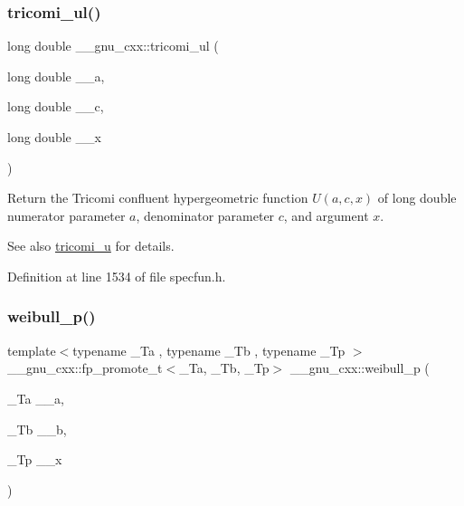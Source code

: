 \subsubsection{\texorpdfstring{tricomi\+\_\+ul()}{tricomi\_ul()}}
{\footnotesize\ttfamily long double \+\_\+\+\_\+gnu\+\_\+cxx\+::tricomi\+\_\+ul (\begin{DoxyParamCaption}\item[{long double}]{\+\_\+\+\_\+a,  }\item[{long double}]{\+\_\+\+\_\+c,  }\item[{long double}]{\+\_\+\+\_\+x }\end{DoxyParamCaption})\hspace{0.3cm}{\ttfamily [inline]}}

Return the Tricomi confluent hypergeometric function $ U(a,c,x) $ of {\ttfamily long double} numerator parameter $ a $, denominator parameter $ c $, and argument $ x $.

\begin{DoxySeeAlso}{See also}
\hyperlink{group__gnu__math__spec__func_gaf51a13fad85006e4d65c5b117e49f7d8}{tricomi\+\_\+u} for details. 
\end{DoxySeeAlso}


Definition at line 1534 of file specfun.\+h.

\mbox{\label{group__gnu__math__spec__func_ga9afb3065fea6ef3a91126d67f726f7af}} 
\subsubsection{\texorpdfstring{weibull\+\_\+p()}{weibull\_p()}}
{\footnotesize\ttfamily template$<$typename \+\_\+\+Ta , typename \+\_\+\+Tb , typename \+\_\+\+Tp $>$ \\
\+\_\+\+\_\+gnu\+\_\+cxx\+::fp\+\_\+promote\+\_\+t$<$\+\_\+\+Ta, \+\_\+\+Tb, \+\_\+\+Tp$>$ \+\_\+\+\_\+gnu\+\_\+cxx\+::weibull\+\_\+p (\begin{DoxyParamCaption}\item[{\+\_\+\+Ta}]{\+\_\+\+\_\+a,  }\item[{\+\_\+\+Tb}]{\+\_\+\+\_\+b,  }\item[{\+\_\+\+Tp}]{\+\_\+\+\_\+x }\end{DoxyParamCaption})\hspace{0.3cm}{\ttfamily [inline]}}



